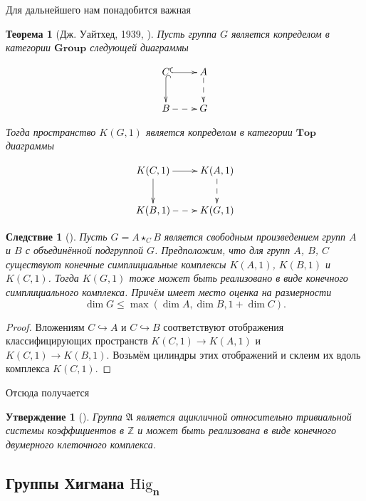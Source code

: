 \documentclass[14pt, dvipsnames, twoside]{extarticle}
\newtheorem{theorem}{Теорема}
\newtheorem{statement}{Утверждение}
\newtheorem{corollary}{Следствие}[theorem]
\theoremstyle{definition}
\theoremstyle{remark}
\let\saveboldsymbol\boldsymbol
\let\boldsymbol\saveboldsymbol
\begin{document}
Для дальнейшего нам понадобится важная

\begin{theorem}[Дж. Уайтхед, 1939, \cite{Whitehead}]\label{Whitehead}
Пусть группа $G$ является копределом в категории $\mathbf{Group}$ следующей диаграммы 

$$\xymatrix{
    C \ar@{^{(}->}[r] \ar@{^{(}->}[d] & A \ar@{-->}[d] \\
    B \ar@{-->}[r]       & G }$$ 
    
Тогда пространство $K(G, 1)$ является копределом в категории $\mathbf{Top}$ диаграммы  

$$\xymatrix{
    K(C, 1) \ar[r] \ar[d] & K(A, 1) \ar@{-->}[d] \\
    K(B, 1) \ar@{-->}[r]       & K(G, 1) }$$ 
    
\end{theorem}

\begin{corollary}[\cite{BDH}]\label{finite}
Пусть $G=A\star_C B$ является свободным произведением групп $A$ и $B$ с объединённой подгруппой $G$. Предположим, что для групп $A$, $B$, $C$ существуют конечные симплициальные комплексы $K(A, 1)$, $K(B, 1)$ и $K(C, 1)$. Тогда $K(G, 1)$ тоже может быть реализовано в виде конечного симплициального комплекса. Причём имеет место оценка на размерности $$\dim G\leqslant \max(\dim A, \dim B, 1+\dim C).$$
\end{corollary} 

\begin{proof}

Вложениям $C\hookrightarrow A$ и $C\hookrightarrow B$ соответствуют отображения классифицирующих пространств $K(C, 1)\to K(A, 1)$ и $K(C, 1)\to K(B, 1)$. Возьмём цилиндры этих отображений и склеим их вдоль комплекса $K(C, 1)$.
\end{proof}

Отсюда получается  

\begin{statement}[\cite{BDH}]
Группа $\mathfrak{A}$ является ацикличной относительно тривиальной системы коэффициентов в $\mathbb{Z}$ и может быть реализована в виде конечного двумерного клеточного комплекса.
\end{statement}











\subsection{Группы Хигмана $\boldsymbol{\mathrm{Hig}_n}$}
\end{document}
